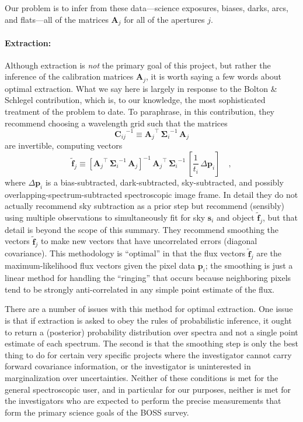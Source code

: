 \documentclass[12pt]{article}
\newcommand{\inverse}[1]{{#1}^{-1}}
\newcommand{\transpose}[1]{{#1}^{\scriptscriptstyle \top}}
\newcommand{\hmatrix}[1]{\boldsymbol{#1}}
\newcommand{\Amatrix}{\hmatrix{A}}
\newcommand{\pixels}{\hmatrix{p}}
\newcommand{\fluxLSF}{\hmatrix{\tilde{f}}}
\newcommand{\sky}{\hmatrix{s}}
\newcommand{\pixelvariance}{\hmatrix{\Sigma}}
\newcommand{\covariance}{\hmatrix{C}}
\begin{document}
Our problem is to infer from these data---science exposures, biases,
darks, arcs, and flats---all of the matrices $\Amatrix_j$ for all of
the apertures $j$.

\paragraph{Extraction:}
Although extraction is \emph{not} the primary goal of this project,
but rather the inference of the calibration matrices $\Amatrix_j$, it
is worth saying a few words about optimal extraction.  What we say
here is largely in response to the Bolton \& Schlegel contribution,
which is, to our knowledge, the most sophisticated treatment of the
problem to date.  To paraphrase, in this contribution, they recommend
choosing a wavelength grid such that the matrices
\begin{equation}
\inverse{\covariance_{ij}} \equiv
  \transpose{\Amatrix_j}\,\inverse{\pixelvariance_i}\,\Amatrix_j
\end{equation}
are invertible, computing vectors
\begin{equation}
\fluxLSF_j \equiv
  \inverse{[\transpose{\Amatrix_j}\,\inverse{\pixelvariance_i}\,\Amatrix_j]}
  \,\transpose{\Amatrix_j}\,\inverse{\pixelvariance_i}
  \,\left[\frac{1}{t_i}\,\Delta\pixels_i\right] \quad ,
\end{equation}
where $\Delta\pixels_i$ is a bias-subtracted, dark-subtracted,
sky-subtracted, and possibly overlapping-spectrum-subtracted
spectroscopic image frame.  In detail they do not actually recommend
sky subtraction as a prior step but recommend (sensibly) using
multiple observations to simultaneously fit for sky $\sky_i$ and
object $\fluxLSF_j$, but that detail is beyond the scope of this
summary.  They recommend smoothing the vectors $\fluxLSF_j$ to make
new vectors that have uncorrelated errors (diagonal covariance).  This
methodology is ``optimal'' in that the flux vectors $\fluxLSF_j$ are
the maximum-likelihood flux vectors given the pixel data $\pixels_i$;
the smoothing is just a linear method for handling the ``ringing''
that occurs because neighboring pixels tend to be strongly
anti-correlated in any simple point estimate of the flux.

There are a number of issues with this method for optimal extraction.
One issue is that if extraction is asked to obey the rules of
probabilistic inference, it ought to return a (posterior) probability
distribution over spectra and not a single point estimate of each
spectrum.  The second is that the smoothing step is only the best
thing to do for certain very specific projects where the investigator
cannot carry forward covariance information, or the investigator is
uninterested in marginalization over uncertainties.  Neither of these
conditions is met for the general spectroscopic user, and in
particular for our purposes, neither is met for the investigators who
are expected to perform the precise measurements that form the primary
science goals of the BOSS survey.
\end{document}
